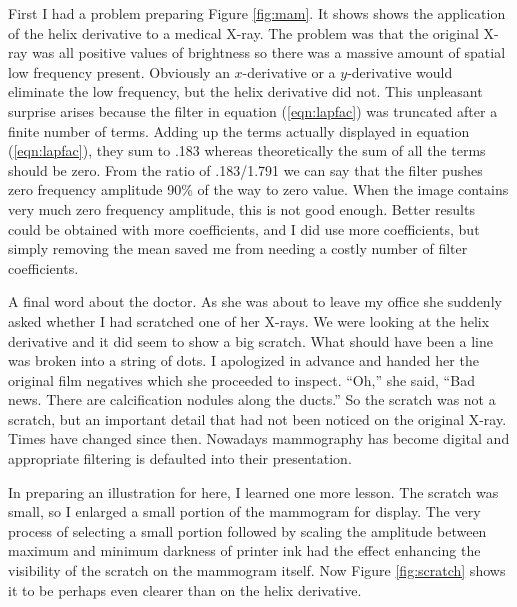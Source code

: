 \par
First I had a problem preparing Figure \ref{fig:mam}.
It shows shows the application of the helix derivative
to a medical X-ray.
The problem was that the original X-ray was all positive
values of brightness so there was a massive amount of
spatial low frequency present.
Obviously an $x$-derivative or a $y$-derivative would
eliminate the low frequency, but the helix derivative did not.
This unpleasant surprise arises
because the filter in equation
(\ref{eqn:lapfac})
was truncated after a finite number of terms.
Adding up the terms actually displayed in equation
(\ref{eqn:lapfac}),
they sum to .183 whereas theoretically the sum of all the terms should be zero.
From the ratio of .183/1.791 we can say that the filter
pushes zero frequency amplitude 90\% of the way to zero value.
When the image contains very much zero frequency amplitude,
this is not good enough.
Better results could be obtained with more coefficients,
and I did use more coefficients,
but simply removing the mean saved me
from needing a costly number of filter coefficients.


\par
A final word about the doctor.
As she was about to leave my office she suddenly asked
whether I had scratched one of her X-rays.
We were looking at the helix derivative
and it did seem to show a big scratch.
What should have been a line was broken into a string of dots.
I apologized in advance and handed her the original film negatives
which she proceeded to inspect.
``Oh,'' she said,
``Bad news. There are calcification nodules along the ducts.''
So the scratch was not a scratch,
but an important detail that had not been noticed on the original X-ray.
Times have changed since then.
Nowadays mammography has become digital
and appropriate filtering is defaulted into their presentation.
\par
In preparing an illustration for here,
I learned one more lesson.
The scratch was small,
so I enlarged a small portion of the mammogram for display.
The very process of selecting a small portion
followed by scaling the amplitude
between maximum and minimum darkness of printer ink
had the effect enhancing the visibility of the scratch on
the mammogram itself.
Now Figure \ref{fig:scratch} shows it to be
perhaps even clearer than on the helix derivative.






